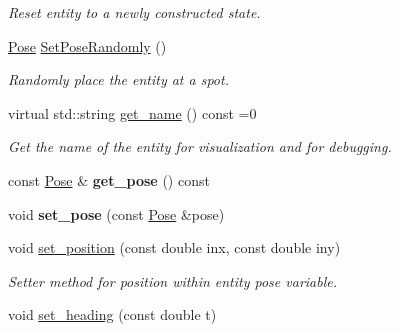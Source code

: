 \begin{DoxyCompactItemize}
\begin{DoxyCompactList}\small\item\em Reset entity to a newly constructed state. \end{DoxyCompactList}\item 
\hyperlink{struct_pose}{Pose} \hyperlink{class_arena_entity_ad9d597b105a901a79c45cbf704c115d0}{Set\+Pose\+Randomly} ()\hypertarget{class_arena_entity_ad9d597b105a901a79c45cbf704c115d0}{}\label{class_arena_entity_ad9d597b105a901a79c45cbf704c115d0}

\begin{DoxyCompactList}\small\item\em Randomly place the entity at a spot. \end{DoxyCompactList}\item 
virtual std\+::string \hyperlink{class_arena_entity_ad43152003033cf01ad86eeff1990b69a}{get\+\_\+name} () const =0
\begin{DoxyCompactList}\small\item\em Get the name of the entity for visualization and for debugging. \end{DoxyCompactList}\item 
const \hyperlink{struct_pose}{Pose} \& {\bfseries get\+\_\+pose} () const \hypertarget{class_arena_entity_af3cf4d62c4392bf9b34238693a0f4d9c}{}\label{class_arena_entity_af3cf4d62c4392bf9b34238693a0f4d9c}

\item 
void {\bfseries set\+\_\+pose} (const \hyperlink{struct_pose}{Pose} \&pose)\hypertarget{class_arena_entity_a6eb76e5f1b5949314c12cc512d6930ae}{}\label{class_arena_entity_a6eb76e5f1b5949314c12cc512d6930ae}

\item 
void \hyperlink{class_arena_entity_a3136704edf07c24639319abf5c28dac0}{set\+\_\+position} (const double inx, const double iny)\hypertarget{class_arena_entity_a3136704edf07c24639319abf5c28dac0}{}\label{class_arena_entity_a3136704edf07c24639319abf5c28dac0}

\begin{DoxyCompactList}\small\item\em Setter method for position within entity pose variable. \end{DoxyCompactList}\item 
void \hyperlink{class_arena_entity_ac1cc3c6997bc7a9573128fc5ded9eb72}{set\+\_\+heading} (const double t)\hypertarget{class_arena_entity_ac1cc3c6997bc7a9573128fc5ded9eb72}{}\label{class_arena_entity_ac1cc3c6997bc7a9573128fc5ded9eb72}


\end{DoxyCompactItemize}
